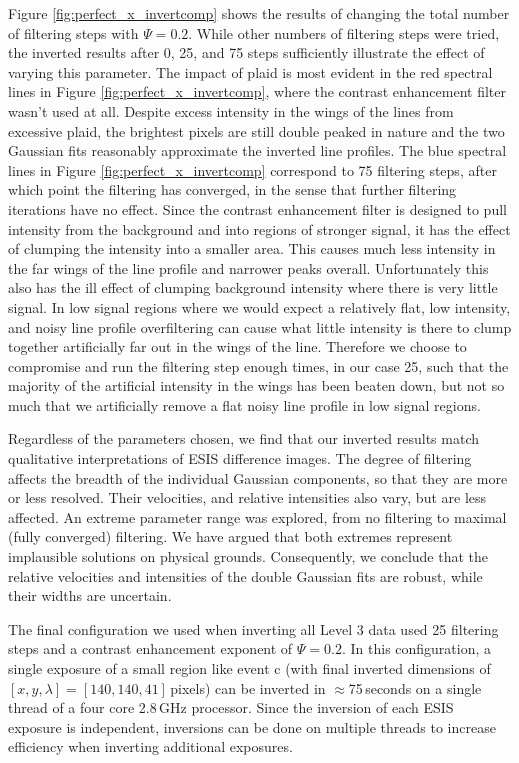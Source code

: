     Figure \ref{fig:perfect_x_invertcomp} shows the results of changing the total number of filtering steps with $\Psi=0.2$.
    While other numbers of filtering steps were tried, the inverted results after 0, 25, and 75 steps sufficiently illustrate the effect of varying this parameter. 
	The impact of plaid is most evident in the red spectral lines in Figure \ref{fig:perfect_x_invertcomp}, where the contrast enhancement filter wasn't used at all.
	Despite excess intensity in the wings of the lines from excessive plaid, the brightest pixels are still double peaked in nature and the two Gaussian fits reasonably approximate the inverted line profiles.
	The blue spectral lines in Figure \ref{fig:perfect_x_invertcomp} correspond to 75 filtering steps, after which point the filtering has converged, in the sense that further filtering iterations have no effect.
	Since the contrast enhancement filter is designed to pull intensity from the background and into regions of stronger signal, it has the effect of clumping the intensity into a smaller area.
	This causes much less intensity in the far wings of the line profile and narrower peaks overall.  
	Unfortunately this also has the ill effect of clumping background intensity where there is very little signal.
	In low signal regions where we would expect a relatively flat, low intensity, and noisy line profile overfiltering can cause what little intensity is there to clump together artificially far out in the wings of the line.
	Therefore we choose to compromise and run the filtering step enough times, in our case 25, such that the majority of the artificial intensity in the wings has been beaten down, but not so much that we artificially remove a flat noisy line profile in low signal regions. 
	
	Regardless of the parameters chosen, we find that our inverted results match qualitative interpretations of ESIS difference images.
	The degree of filtering affects the breadth of the individual Gaussian components, so that they are more or less resolved. 
	Their velocities, and relative intensities also vary, but are less affected. 
	An extreme parameter range was explored, from no filtering to maximal (fully converged) filtering. 
	We have argued that both extremes represent implausible solutions on physical grounds. Consequently, we conclude that the relative velocities and intensities of the double Gaussian fits are robust, while their widths are uncertain. 
		
	The final configuration we used when inverting all Level 3 data used 25 filtering steps and a contrast enhancement exponent of $\Psi=0.2$.
	In this configuration, a single exposure of a small region like event c (with final inverted dimensions of $[x,y,\lambda] = [140,140,41]$\,pixels) can be inverted in $\approx$75\,seconds on a single thread of a four core 2.8\,GHz processor.
	Since the inversion of each ESIS exposure is independent, inversions can be done on multiple threads to increase efficiency when inverting additional exposures.
	

	  

